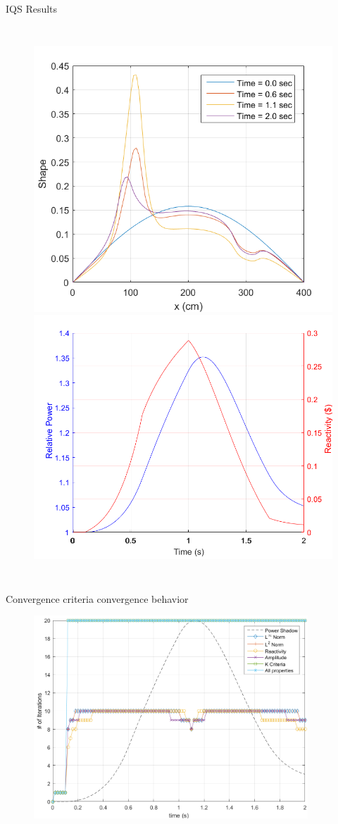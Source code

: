 \documentclass[8pt,xcolor=dvipnames]{beamer}
\begin{document}
\begin{frame}{IQS Results}

\begin{columns}
\column{\dimexpr\paperwidth-10pt}
\begin{figure}
\includegraphics[width=0.45\linewidth]{figures/1D_shape2.png}
\includegraphics[width=0.55\linewidth]{figures/1D_iqs_power.png}
\end{figure}
\end{columns}

\end{frame}

\begin{frame}{Convergence criteria convergence behavior}

\begin{figure}
\includegraphics[width=\linewidth,height=3in,keepaspectratio]{figures/iter_renorm.png}
\end{figure}

\end{frame}
\end{document}

